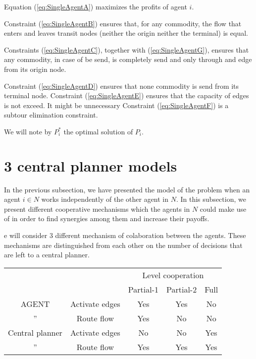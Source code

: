 \documentclass[review]{elsarticle}
\begin{document}
Equation (\ref{eq:SingleAgentA}) maximizes the profits of agent $i$. 

Constraint (\ref{eq:SingleAgentB}) ensures that, for any commodity, the flow that enters and leaves transit nodes (neither the origin neither the terminal) is equal.


Constraints (\ref{eq:SingleAgentC}), together with (\ref{eq:SingleAgentG}), ensures that any commodity, in case of be send, is completely send and only through and edge from its origin node.

Constraint (\ref{eq:SingleAgentD}) ensures that none commodity is send from its terminal node. Constraint (\ref{eq:SingleAgentE}) ensures that the capacity of edges is not exceed. It might be unnecessary
Constraint (\ref{eq:SingleAgentF}) is a subtour elimination constraint.

We will note by $P_i^*$ the optimal solution of $P_i$.

\section{3 central planner models}


In the previous subsection, we have presented the model of the problem when an agent $i\in N$ works independently of the other
agent in $N$. In this subsection, we present different cooperative mechanisms which the agents
in $N$ could make use of in order to find synergies among them and increase their payoffs.

e will consider 3 different mechanism of colaboration between the agents. These mechanisms are distinguished from each other on
the number of decisions that are left to a central planner. 


\begin{table}[ht!]
    \begin{tabular}{cc|ccc}
        & &      \multicolumn{3}{|c}{Level cooperation} \\\cline{3-5}
        & & Partial-1 & Partial-2 & Full \\ \hline
        AGENT & Activate edges & Yes & Yes & No \\
        '' & Route flow     & Yes & No & No \\\hline
        Central planner & Activate edges & No & No & Yes \\
        '' & Route flow & Yes & Yes & Yes
        \end{tabular}
    \end {table}
\end{document}
